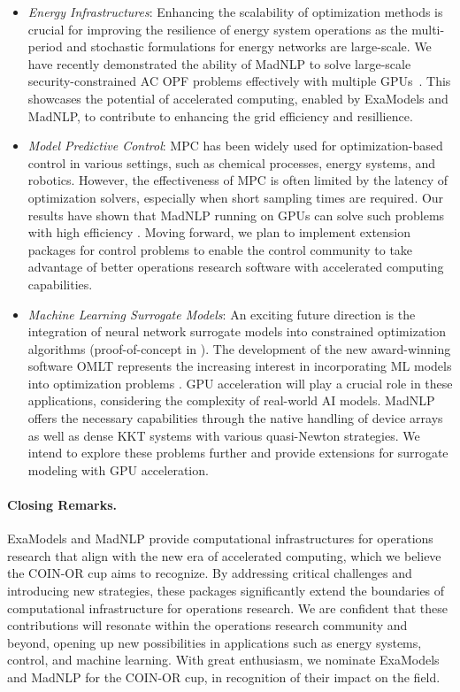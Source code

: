 \begin{itemize}
\item \textit{Energy Infrastructures}: Enhancing the scalability of
optimization methods is crucial for improving the resilience of energy
system operations as the multi-period and stochastic formulations for
energy networks are large-scale. We have recently demonstrated the
ability of MadNLP to solve large-scale security-constrained AC OPF
problems effectively with multiple GPUs~\cite{pacaud2023parallel}.
This showcases the potential of accelerated computing, enabled by
ExaModels and MadNLP, to contribute to enhancing the grid efficiency
and resillience.

\item \textit{Model Predictive Control}: MPC has been widely used for
optimization-based control in various settings, such as chemical
processes, energy systems, and robotics. However, the effectiveness of
MPC is often limited by the latency of optimization solvers,
especially when short sampling times are required. Our results have
shown that MadNLP running on GPUs can solve such problems with high
efficiency \cite{cole2023exploiting}. Moving forward, we plan to
implement extension packages for control problems to enable
the control community to take advantage of better operations research
software with accelerated computing capabilities.

\item \textit{Machine Learning Surrogate Models}: An exciting future
direction is the integration of neural network surrogate models into
constrained optimization algorithms (proof-of-concept in
\cite{shin2023constrained}). The development of the new award-winning
software OMLT represents the increasing interest in incorporating ML
models into optimization problems \cite{ceccon2022omlt}. GPU
acceleration will play a crucial role in these applications,
considering the complexity of real-world AI models. MadNLP offers the
necessary capabilities through the native handling of device arrays as 
well as dense KKT systems with various quasi-Newton strategies. We
intend to explore these problems further and provide extensions for
surrogate modeling with GPU acceleration.

\end{itemize}

\paragraph{Closing Remarks.} ExaModels and MadNLP provide computational
infrastructures for operations research that align with the new era of
accelerated computing, which we believe the COIN-OR cup aims to
recognize. By addressing critical challenges and introducing new
strategies, these packages significantly extend the boundaries of
computational infrastructure for operations research. We are confident
that these contributions will resonate within the operations research
community and beyond, opening up new possibilities in applications
such as energy systems, control, and machine learning. With great
enthusiasm, we nominate ExaModels and MadNLP for the COIN-OR cup, in
recognition of their impact on the field.




